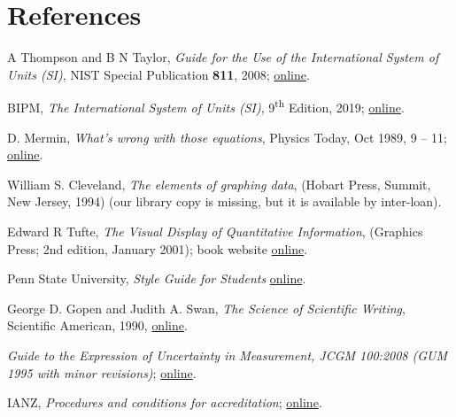 \section{References}

\begingroup
\renewcommand{\section}[2]{}%

\begin{thebibliography}{9}
A Thompson and B N Taylor, \textit{Guide for the Use of the International System of Units (SI)}, NIST Special Publication \textbf{811}, 2008; \href{http://www.nist.gov/pml/pubs/sp811/index.cfm}{online}.

BIPM, \textit{The International System of Units (SI)}, 9\textsuperscript{th} Edition, 2019; \href{https://www.bipm.org/en/publications/si-brochure/}{online}.

D. Mermin, \textit{What’s wrong with those equations}, Physics Today, Oct 1989, 9 – 11; \href{http://home.sandiego.edu/~severn/p480w/mathprose.pdf}{online}. 

William S. Cleveland, \textit{The elements of graphing data}, (Hobart Press, Summit, New Jersey, 1994) (our library copy is missing, but it is available by inter-loan).

Edward R Tufte, \textit{The Visual Display of Quantitative Information}, (Graphics Press; 2nd edition, January 2001); book website \href{http://www.edwardtufte.com/tufte/books_vdqi}{online}.

Penn State University, \textit{Style Guide for Students} \href{https://www.e-education.psu.edu/styleforstudents/}{online}.

George D. Gopen and Judith A. Swan, \textit{The Science of Scientific Writing}, Scientific American, 1990, \href{https://www.e-education.psu.edu/styleforstudents/c10_p6.html}{online}.

 \textit{Guide to the Expression of Uncertainty in Measurement, JCGM 100:2008 (GUM 1995 with minor revisions)}; \href{http://www.bipm.org/utils/common/documents/jcgm/JCGM_100_2008_E.pdf}{online}.

 IANZ, \textit{Procedures and conditions for accreditation}; \href{http://www.ianz.govt.nz/resources/documents-2/supplementary-criteria/}{online}.


\end{thebibliography}
